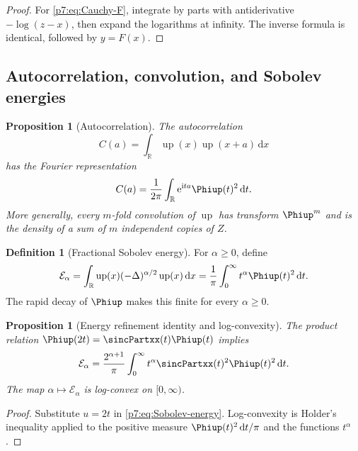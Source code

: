 \documentclass[11pt,oneside]{article}
\newtheorem{proposition}[theorem]{Proposition}
\theoremstyle{definition}
\newtheorem{definition}[theorem]{Definition}
\theoremstyle{remark}
\newcommand{\Up}{\operatorname{up}}
\newcommand{\R}{\mathbb R}
\newcommand{\dd}{\,\mathrm d}
\newcommand{\e}{\mathrm e}
\newcommand{\ii}{\mathrm i}
\newcommand{\1}{\mathbf 1}
\begin{document}
\begin{proof}
For \cref{p7:eq:Cauchy-F}, integrate by parts with antiderivative $-\log(z-x)$, then expand the
logarithms at infinity.  The inverse formula is identical, followed by $y=F(x)$.
\end{proof}

\subsection{Autocorrelation, convolution, and Sobolev energies}

\begin{proposition}[Autocorrelation]
\label{p7:prop:autocorrelation}
The autocorrelation
\begin{equation}
 C(a)=\int_{\R}\Up(x)\Up(x+a)\dd x
 \label{p7:eq:autocorrelation-def}
\end{equation}
has the Fourier representation
\begin{equation}
 C(a)=\frac1{2\pi}\int_{\R}\e^{\ii ta}\Phiup(t)^2\dd t.
 \label{p7:eq:autocorrelation-Fourier}
\end{equation}
More generally, every $m$-fold convolution of $\Up$ has transform $\Phiup^m$ and is the
density of a sum of $m$ independent copies of $Z$.
\end{proposition}

\begin{definition}[Fractional Sobolev energy]
For $\alpha\ge0$, define
\begin{equation}
 \mathcal E_\alpha
 =\int_{\R}\Up(x)(-\Delta)^{\alpha/2}\Up(x)\dd x
 =\frac1\pi\int_0^{\infty}t^\alpha\Phiup(t)^2\dd t.
 \label{p7:eq:Sobolev-energy}
\end{equation}
The rapid decay of $\Phiup$ makes this finite for every $\alpha\ge0$.
\end{definition}

\begin{proposition}[Energy refinement identity and log-convexity]
\label{p7:prop:energy-refinement}
The product relation $\Phiup(2t)=\sincPartxx(t)\Phiup(t)$ implies
\begin{equation}
 \mathcal E_\alpha
 =\frac{2^{\alpha+1}}\pi\int_0^{\infty}
 t^\alpha\sincPartxx(t)^2\Phiup(t)^2\dd t.
 \label{p7:eq:energy-refinement}
\end{equation}
The map $\alpha\mapsto\mathcal E_\alpha$ is log-convex on $[0,\infty)$.
\end{proposition}

\begin{proof}
Substitute $u=2t$ in \cref{p7:eq:Sobolev-energy}.  Log-convexity is Holder's inequality applied
to the positive measure $\Phiup(t)^2\dd t/\pi$ and the functions $t^\alpha$.
\end{proof}
\end{document}

